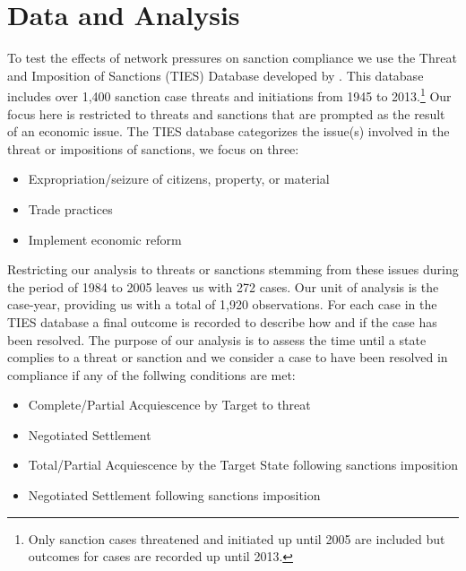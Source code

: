 \section*{Data and Analysis}
\label{empirics}

To test the effects of network pressures on sanction compliance we use the Threat and Imposition of Sanctions (TIES) Database developed by \citet{morgan2009threat}. This database includes over 1,400 sanction case threats and initiations from 1945 to 2013.\footnote{Only sanction cases threatened and initiated up until 2005 are included but outcomes for cases are recorded up until 2013.} Our focus here is restricted to threats and sanctions that are prompted as the result of an economic issue. The TIES database categorizes the issue(s) involved in the threat or impositions of sanctions, we focus on three:

\begin{singlespacing}
\begin{itemize}
	\item Expropriation/seizure of citizens, property, or material
	\item Trade practices
	\item Implement economic reform
\end{itemize}
\end{singlespacing}



Restricting our analysis to threats or sanctions stemming from these issues during the period of 1984 to 2005 leaves us with 272 cases. Our unit of analysis is the case-year, providing us with a total of 1,920 observations. For each case in the TIES database a final outcome is recorded to describe how and if the case has been resolved. The purpose of our analysis is to assess the time until a state complies to a threat or sanction and we consider a case to have been resolved in compliance if any of the follwing conditions are met:

\begin{singlespacing}
\begin{itemize}
	\item Complete/Partial Acquiescence by Target to threat
	\item Negotiated Settlement
	\item Total/Partial Acquiescence by the Target State following sanctions imposition
	\item Negotiated Settlement following sanctions imposition
\end{itemize}
\end{singlespacing}
	
